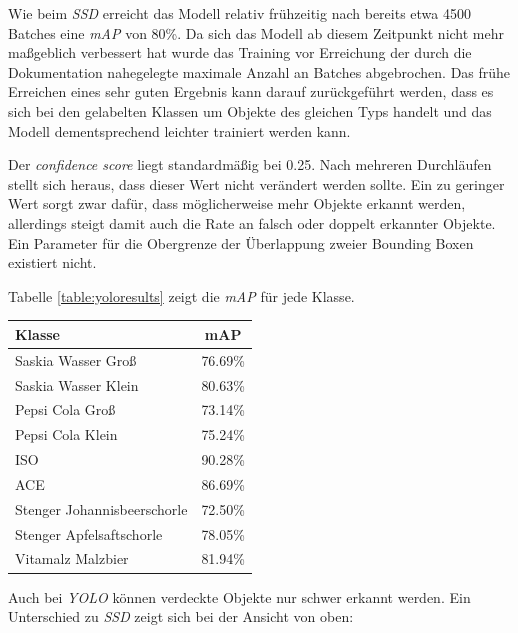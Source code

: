 Wie beim \textit{SSD} erreicht das Modell relativ frühzeitig nach bereits etwa 4500 Batches eine \textit{mAP} von 80\%. Da sich das Modell ab diesem Zeitpunkt nicht mehr maßgeblich verbessert hat wurde das Training vor Erreichung der durch die Dokumentation nahegelegte maximale Anzahl an Batches abgebrochen. Das frühe Erreichen eines sehr guten Ergebnis kann darauf zurückgeführt werden, dass es sich bei den gelabelten Klassen um Objekte des gleichen Typs handelt und das Modell dementsprechend leichter trainiert werden kann. 

Der \textit{confidence score} liegt standardmäßig bei 0.25. Nach mehreren Durchläufen stellt sich heraus, dass dieser Wert nicht verändert werden sollte. Ein zu geringer Wert sorgt zwar dafür, dass möglicherweise mehr Objekte erkannt werden, allerdings steigt damit auch die Rate an falsch oder doppelt erkannter Objekte. Ein Parameter für die Obergrenze der Überlappung zweier Bounding Boxen existiert nicht.

Tabelle \ref{table:yoloresults} zeigt die \textit{mAP} für jede Klasse.

\begin{center}
	\begin{tabular}[H]{l|c}
		Klasse & mAP \\
		\hline
		Saskia Wasser Groß & 76.69\% \\
		Saskia Wasser Klein & 80.63\% \\
		Pepsi Cola Groß & 73.14\% \\
		Pepsi Cola Klein & 75.24\% \\
		ISO & 90.28\% \\
		ACE & 86.69\% \\
		Stenger Johannisbeerschorle & 72.50\% \\
		Stenger Apfelsaftschorle & 78.05\% \\
		Vitamalz Malzbier & 81.94\%
	\end{tabular}
	\label{table:yoloresults}
\end{center}

Auch bei \textit{YOLO} können verdeckte Objekte nur schwer erkannt werden. Ein Unterschied zu \textit{SSD} zeigt sich bei der Ansicht von oben:

